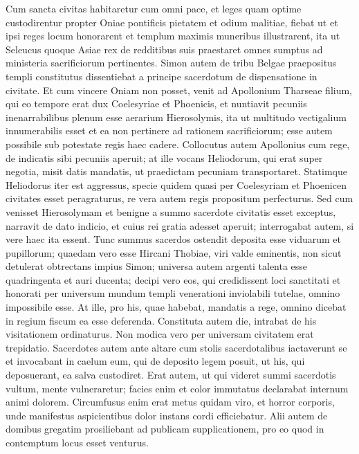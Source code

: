 \begin{biblechapter}
\begin{biblechapter}
\begin{biblechapter}
\verse Cum sancta civitas habitaretur cum omni pace, et leges quam optime custodirentur propter Oniae pontificis pietatem et odium malitiae, 
\verse fiebat ut et ipsi reges locum honorarent et templum maximis muneribus illustrarent, 
 \verse ita ut Seleucus quoque Asiae rex de redditibus suis praestaret omnes sumptus ad ministeria sacrificiorum pertinentes. 
\verse Simon autem de tribu Belgae praepositus templi constitutus dissentiebat a principe sacerdotum de dispensatione in civitate. 
\verse Et cum vincere Oniam non posset, venit ad Apollonium Tharseae filium, qui eo tempore erat dux Coelesyriae et Phoenicis, 
 \verse et nuntiavit pecuniis inenarrabilibus plenum esse aerarium Hierosolymis, ita ut multitudo vectigalium innumerabilis esset et ea non pertinere ad rationem sacrificiorum; esse autem possibile sub potestate regis haec cadere.
 \verse Collocutus autem Apollonius cum rege, de indicatis sibi pecuniis aperuit; at ille vocans Heliodorum, qui erat super negotia, misit datis mandatis, ut praedictam pecuniam transportaret. 
\verse Statimque Heliodorus iter est aggressus, specie quidem quasi per Coelesyriam et Phoenicen civitates esset peragraturus, re vera autem regis propositum perfecturus. 
\verse Sed cum venisset Hierosolymam et benigne a summo sacerdote civitatis esset exceptus, narravit de dato indicio, et cuius rei gratia adesset aperuit; interrogabat autem, si vere haec ita essent. 
\verse Tunc summus sacerdos ostendit deposita esse viduarum et pupillorum; 
 \verse quaedam vero esse Hircani Thobiae, viri valde eminentis, non sicut detulerat obtrectans impius Simon; universa autem argenti talenta esse quadringenta et auri ducenta; 
\verse decipi vero eos, qui credidissent loci sanctitati et honorati per universum mundum templi venerationi inviolabili tutelae, omnino impossibile esse.
 \verse At ille, pro his, quae habebat, mandatis a rege, omnino dicebat in regium fiscum ea esse deferenda.
 \verse Constituta autem die, intrabat de his visitationem ordinaturus. Non modica vero per universam civitatem erat trepidatio. 
\verse Sacerdotes autem ante altare cum stolis sacerdotalibus iactaverunt se et invocabant in caelum eum, qui de deposito legem posuit, ut his, qui deposuerant, ea salva custodiret. 
\verse Erat autem, ut qui videret summi sacerdotis vultum, mente vulneraretur; facies enim et color immutatus declarabat internum animi dolorem. 
\verse Circumfusus enim erat metus quidam viro, et horror corporis, unde manifestus aspicientibus dolor instans cordi efficiebatur. 
\verse Alii autem de domibus gregatim prosiliebant ad publicam supplicationem, pro eo quod in contemptum locus esset venturus. 

\end{biblechapter}
\end{biblechapter}
\end{biblechapter}
